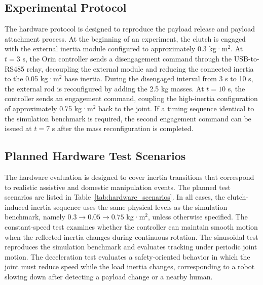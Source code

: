 \documentclass[lettersize,journal]{IEEEtran}
\begin{document}
\subsection{Experimental Protocol}

The hardware protocol is designed to reproduce the payload release and payload attachment process. At the beginning of an experiment, the clutch is engaged with the external inertia module configured to approximately 0.3 kg·m$^2$. At $t=3$ s, the Orin controller sends a disengagement command through the USB-to-RS485 relay, decoupling the external module and reducing the connected inertia to the 0.05 kg·m$^2$ base inertia. During the disengaged interval from 3 s to 10 s, the external rod is reconfigured by adding the 2.5 kg masses. At $t=10$ s, the controller sends an engagement command, coupling the high-inertia configuration of approximately 0.75 kg·m$^2$ back to the joint. If a timing sequence identical to the simulation benchmark is required, the second engagement command can be issued at $t=7$ s after the mass reconfiguration is completed.

\subsection{Planned Hardware Test Scenarios}

The hardware evaluation is designed to cover inertia transitions that correspond to realistic assistive and domestic manipulation events. The planned test scenarios are listed in Table~\ref{tab:hardware_scenarios}. In all cases, the clutch-induced inertia sequence uses the same physical levels as the simulation benchmark, namely $0.3 \rightarrow 0.05 \rightarrow 0.75$ kg·m$^2$, unless otherwise specified. The constant-speed test examines whether the controller can maintain smooth motion when the reflected inertia changes during continuous rotation. The sinusoidal test reproduces the simulation benchmark and evaluates tracking under periodic joint motion. The deceleration test evaluates a safety-oriented behavior in which the joint must reduce speed while the load inertia changes, corresponding to a robot slowing down after detecting a payload change or a nearby human.
\end{document}

